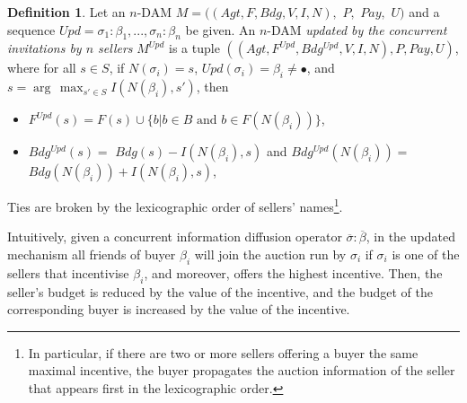 \documentclass[letterpaper]{article} %
\theoremstyle{definition}
\newtheorem{definition}{Definition}
\newcommand{\Upd}{\mathit{Upd}}
\newcommand{\Pay}{\mathit{Pay}}
\begin{document}
\begin{definition}
    Let an $n$-DAM $M = ((Agt, F, Bdg, V, I, N),$ $P,$ $\Pay,$ $U)$ and a sequence $\Upd = \sigma_1: \beta_1, ..., \sigma_n: \beta_n$ be given. An $n$-DAM \emph{updated by the concurrent invitations by $n$ sellers} %
    $M^{\Upd}$ is a tuple $((Agt, F^{\Upd}, Bdg^{\Upd}, V, I, N), P, \Pay, U)$, where for all $s \in S$, if $N(\sigma_i) = s$, $\Upd(\sigma_i) = \beta_i \neq \bullet$,   and $s = \arg\,\max_{s'\in S}I(N(\beta_i),s')$, then
    \begin{itemize}
        \item  %
        $F^{\Upd}(s) = F(s) \cup \{b | b \in B \text{ and }b \in F(N(\beta_i))\}$,
        \item %
        $Bdg^{\Upd}(s) =$ $Bdg(s) - I(N(\beta_i),s)$ and $Bdg^{\Upd}(N(\beta_i)) =$ $Bdg(N(\beta_i)) + I(N(\beta_i),s)$,
    \end{itemize}
    Ties are broken by the lexicographic order of sellers' names\footnote{In particular, if there are two or more sellers offering a buyer the same maximal incentive, the buyer propagates the auction information of the seller that appears first in the lexicographic order.}.
\end{definition}

Intuitively, given a concurrent information diffusion operator $\overline{\sigma}: \overline{\beta}$, in the updated mechanism all friends of buyer $\beta_i$ will join the auction run by $\sigma_i$ if $\sigma_i$ is one of the sellers that incentivise $\beta_i$, and moreover, offers the highest incentive. Then, the seller's budget is reduced by the value of the incentive, and the budget of the corresponding buyer is increased by the value of the incentive.    
\end{document}
